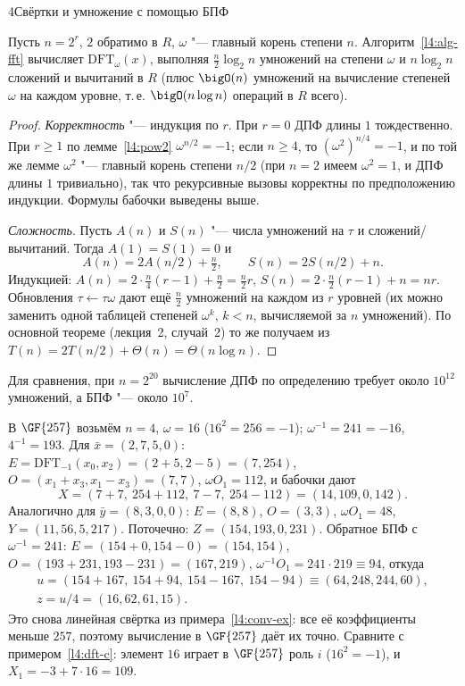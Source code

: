\begin{lecture}{4}{Свёртки и умножение с помощью БПФ}
\begin{theorem}\label{l4:fft}
Пусть $n = 2^r$, $2$ обратимо в $R$, $\omega$ "--- главный корень степени $n$. Алгоритм~\ref{l4:alg-fft}
вычисляет $\mathrm{DFT}_\omega(x)$, выполняя $\frac n2 \log_2 n$ умножений на степени $\omega$ и
$n \log_2 n$ сложений и вычитаний в $R$ (плюс $\bigO(n)$ умножений на вычисление степеней
$\omega$ на каждом уровне, т.\,е. $\bigO(n \log n)$ операций в $R$ всего).
\end{theorem}

\begin{proof}
\emph{Корректность} "--- индукция по $r$. При $r = 0$ ДПФ длины $1$ тождественно. При $r \ge 1$
по лемме~\ref{l4:pow2} $\omega^{n/2} = -1$; если $n \ge 4$, то $(\omega^2)^{n/4} = -1$, и по той же
лемме $\omega^2$ "--- главный корень степени $n/2$ (при $n = 2$ имеем $\omega^2 = 1$, и ДПФ
длины $1$ тривиально), так что рекурсивные вызовы корректны по предположению индукции.
Формулы бабочки выведены выше.

\emph{Сложность}. Пусть $A(n)$ и $S(n)$ "--- числа умножений на $\tau$ и сложений/вычитаний.
Тогда $A(1) = S(1) = 0$ и
\[
  A(n) = 2A(n/2) + \tfrac n2, \qquad S(n) = 2S(n/2) + n .
\]
Индукцией: $A(n) = 2 \cdot \frac n4 (r - 1) + \frac n2 = \frac n2 r$, $S(n) = 2 \cdot \frac n2 (r - 1) + n = nr$.
Обновления $\tau \gets \tau\omega$ дают ещё $\frac n2$ умножений на каждом из $r$ уровней (их можно
заменить одной таблицей степеней $\omega^k$, $k < n$, вычисляемой за $n$ умножений). По основной
теореме (лекция~2, случай~2) то же получаем из $T(n) = 2T(n/2) + \Theta(n) = \Theta(n \log n)$.
\end{proof}

Для сравнения, при $n = 2^{20}$ вычисление ДПФ по определению требует около $10^{12}$
умножений, а БПФ "--- около $10^{7}$.

\begin{example}\label{l4:fft-ex}
В $\GF{257}$ возьмём $n = 4$, $\omega = 16$ ($16^2 = 256 = -1$); $\omega^{-1} = 241 = -16$,
$4^{-1} = 193$. Для $\bar x = (2, 7, 5, 0)$: $E = \mathrm{DFT}_{-1}(x_0, x_2) = (2 + 5, 2 - 5) = (7, 254)$,
$O = (x_1 + x_3, x_1 - x_3) = (7, 7)$, $\omega O_1 = 112$, и бабочки дают
\[
  X = (7 + 7,\ 254 + 112,\ 7 - 7,\ 254 - 112) = (14, 109, 0, 142).
\]
Аналогично для $\bar y = (8, 3, 0, 0)$: $E = (8, 8)$, $O = (3, 3)$, $\omega O_1 = 48$,
$Y = (11, 56, 5, 217)$. Поточечно: $Z = (154, 193, 0, 231)$. Обратное БПФ с $\omega^{-1} = 241$:
$E = (154 + 0, 154 - 0) = (154, 154)$, $O = (193 + 231, 193 - 231) = (167, 219)$,
$\omega^{-1} O_1 = 241 \cdot 219 \equiv 94$, откуда
\[
\begin{gathered}
  u = (154 + 167,\ 154 + 94,\ 154 - 167,\ 154 - 94) \equiv (64, 248, 244, 60),\\
  z = u / 4 = (16, 62, 61, 15).
\end{gathered}
\]
Это снова линейная свёртка из примера~\ref{l4:conv-ex}: все её коэффициенты меньше $257$,
поэтому вычисление в $\GF{257}$ даёт их точно. Сравните с примером~\ref{l4:dft-c}: элемент $16$
играет в $\GF{257}$ роль $i$ ($16^2 = -1$), и $X_1 = -3 + 7 \cdot 16 = 109$.
\end{example}


\end{lecture}
